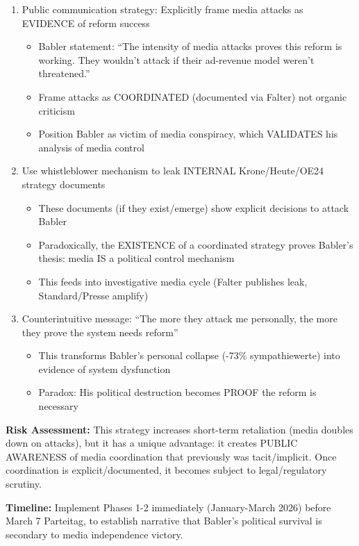 \begin{enumerate}
\item Public communication strategy: Explicitly frame media attacks as EVIDENCE of reform success
  \begin{itemize}
  \item Babler statement: ``The intensity of media attacks proves this reform is working. They wouldn't attack
    if their ad-revenue model weren't threatened.''
  \item Frame attacks as COORDINATED (documented via Falter) not organic criticism
  \item Position Babler as victim of media conspiracy, which VALIDATES his analysis of media control
  \end{itemize}

\item Use whistleblower mechanism to leak INTERNAL Krone/Heute/OE24 strategy documents
  \begin{itemize}
  \item These documents (if they exist/emerge) show explicit decisions to attack Babler
  \item Paradoxically, the EXISTENCE of a coordinated strategy proves Babler's thesis: media IS a political control mechanism
  \item This feeds into investigative media cycle (Falter publishes leak, Standard/Presse amplify)
  \end{itemize}

\item Counterintuitive message: ``The more they attack me personally, the more they prove the system needs reform''
  \begin{itemize}
  \item This transforms Babler's personal collapse (-73\% sympathiewerte) into evidence of system dysfunction
  \item Paradox: His political destruction becomes PROOF the reform is necessary
  \end{itemize}
\end{enumerate}

\textbf{Risk Assessment:} This strategy increases short-term retaliation (media doubles down on attacks),
but it has a unique advantage: it creates PUBLIC AWARENESS of media coordination that previously was tacit/implicit.
Once coordination is explicit/documented, it becomes subject to legal/regulatory scrutiny.

\textbf{Timeline:} Implement Phases 1-2 immediately (January-March 2026) before March 7 Parteitag,
to establish narrative that Babler's political survival is secondary to media independence victory.

